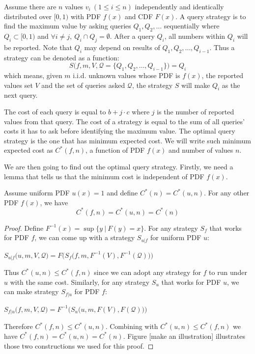 \begin{definition}\label{def:query}

Assume there are $n$ values $v_i ~(1 \leq i \leq n)$ independently and
identically distributed over $[0, 1)$ with PDF $f(x)$ and CDF $F(x)$.  A query
strategy is to find the maximum value by asking queries $Q_1, Q_2, \ldots$
sequentially where $Q_i \subset [0, 1)$ and $\forall i \neq j, ~Q_i \cap Q_j =
\emptyset$.  After a query $Q_i$, all numbers within $Q_i$ will be reported.
Note that $Q_i$ may depend on results of $Q_1, Q_2, \ldots, Q_{i-1}$. Thus a
strategy can be denoted as a function:
\begin{displaymath}
	S\big(f, m, V, \mathcal Q = \{Q_1, Q_2, \ldots, Q_{i-1} \}\big) = Q_i
\end{displaymath}
which means, given $m$ i.i.d. unknown values whose PDF is $f(x)$, the reported
values set $V$ and the set of queries asked $\mathcal Q$, the strategy $S$ will
make $Q_i$ as the next query.

The cost of each query is equal to $b+j \cdot c$ where $j$ is the number of
reported values from that query. The cost of a strategy is equal to the sum of
all queries' costs it has to ask before identifying the maximum value. The
optimal query strategy is the one that has minimum expected cost.
We will write such minimum expected cost as $C^*(f, n)$, a function
of PDF $f(x)$ and number of values $n$.

\end{definition}

We are then going to find out the optimal query strategy. Firstly, we need
a lemma that tells us that the minimum cost is independent of PDF $f(x)$.

\begin{lemma}\label{lemma:uniform}

Assume uniform PDF $u(x) = 1$ and define $C^*(n) = C^*(u, n)$.
For any other PDF $f(x)$, we have 
\[C^*(f, n) = C^*(u, n) = C^*(n)\]

\end{lemma}

\begin{proof}

Define $F^{-1}(x) = \sup\{y ~|~ F(y) = x\}$. For any strategy $S_f$ that works
for PDF $f$, we can come up with a strategy $S_{u|f}$ for uniform PDF $u$:

$
S_{u|f}\big(u, m, V, \mathcal Q \big) = F\Big( S_f\big( f, m, F^{-1}(V), F^{-1} (\mathcal Q) \big) \Big)
$

Thus $C^*(u, n) \leq C^*(f, n)$ since we can adopt any strategy for $f$ to run
under $u$ with the same cost.  Similarly, for any strategy $S_u$ that works for
PDF $u$, we can make strategy $S_{f|u}$ for PDF $f$:

$
S_{f|u}\big(f, m, V, \mathcal Q \big) = F^{-1}\Big( S_u\big( u, m, F(V), F (\mathcal Q) \big) \Big)
$

Therefore $C^*(f, n) \leq C^*(u, n)$. Combining with $C^*(u, n) \leq C^*(f, n)$
we have $C^*(f, n) = C^*(u, n) = C^*(n)$. Figure [make an illustration]
illustrates those two constructions we used for this proof.

\end{proof}

